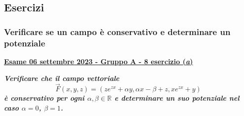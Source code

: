 \documentclass[a4paper]{article}
\newcommand{\definition}[1]{\textcolor{Red3}{\textbf{#1}}}
\newcommand{\example}[1]{\textcolor{Green4}{\textbf{#1}}}
\begin{document}
	\subsection{Esercizi}

	\subsubsection{Verificare se un campo è conservativo e determinare un potenziale}
	
	\begin{flushleft}
		\label{exam: esame 06 settembre 2023 - Gruppo A - 8 esercizio (a)}
		\hypertarget{
			exam: esame 06 settembre 2023 - Gruppo A - 8 esercizio (a)
		}{
			\definition{\underline{Esame 06 settembre 2023 - Gruppo A - 8 esercizio (\emph{a})}}
		}
	\end{flushleft}
	\example{\emph{Verificare che il campo vettoriale}
	\begin{equation*}
		\overset{\rightarrow}{F}\left(x,y,z\right) = \left(ze^{zx}+\alpha y, \alpha x - \beta + z, xe^{zx}+y\right)
	\end{equation*}
	\emph{è conservativo per ogni $\alpha, \beta \in \mathbb{R}$ e determinare un suo potenziale nel caso $\alpha = 0$, $\beta = 1$.}}\newline
\end{document}
